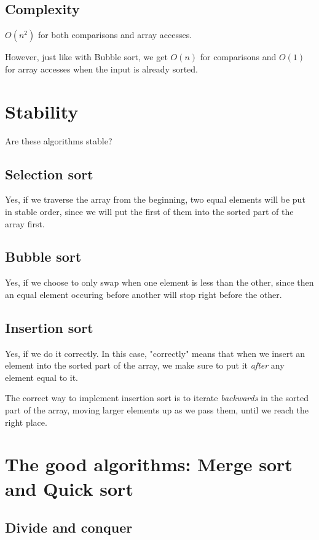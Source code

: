 \documentclass{article}
\begin{document}
\subsection{Complexity}

$O(n^2)$ for both comparisons and array accesses.

However, just like with Bubble sort, we get $O(n)$ for comparisons and $O(1)$ for array accesses when the input is already sorted.

\section{Stability}

Are these algorithms stable?

\subsection{Selection sort}

Yes, if we traverse the array from the beginning, two equal elements will be put in stable order, since we will put the first of them into the sorted part of the array first.

\subsection{Bubble sort}

Yes, if we choose to only swap when one element is less than the other, since then an equal element occuring before another will stop right before the other.

\subsection{Insertion sort}

Yes, if we do it correctly. In this case, "correctly" means that when we insert an element into the sorted part of the array, we make sure to put it \textit{after} any element equal to it.

The correct way to implement insertion sort is to iterate \textit{backwards} in the sorted part of the array, moving larger elements up as we pass them, until we reach the right place.


\section{The good algorithms: Merge sort and Quick sort}

\subsection{Divide and conquer}
\end{document}
